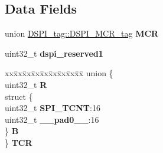\subsection*{Data Fields}
\begin{DoxyCompactItemize}
\item 
\mbox{\label{structDSPI__tag_ae51db989ea7620f8d19de15e2522188e}} 
union \mbox{\hyperlink{unionDSPI__tag_1_1DSPI__MCR__tag}{D\+S\+P\+I\+\_\+tag\+::\+D\+S\+P\+I\+\_\+\+M\+C\+R\+\_\+tag}} {\bfseries M\+CR}
\item 
\mbox{\label{structDSPI__tag_a59d2e2e60441cb2222def40150a3a728}} 
uint32\+\_\+t {\bfseries dspi\+\_\+reserved1}
\item 
\mbox{\label{structDSPI__tag_a67741ec7f5e7cc81a7cc9e7167a36297}} 
\begin{tabbing}
xx\=xx\=xx\=xx\=xx\=xx\=xx\=xx\=xx\=\kill
union \{\\
\>uint32\_t {\bfseries R}\\
\>struct \{\\
\>\>uint32\_t {\bfseries SPI\_TCNT}:16\\
\>\>uint32\_t {\bfseries \_\_pad0\_\_}:16\\
\>\} {\bfseries B}\\
\} {\bfseries TCR}\\


\end{tabbing}
\end{DoxyCompactItemize}

